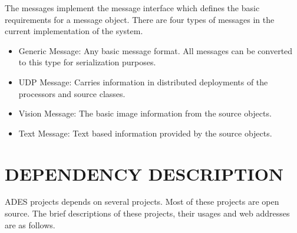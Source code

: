 \documentclass[a4paper,oneside,12pt]{report}
\begin{document}
The messages implement the message interface which defines the basic requirements for a message object. There are four types of messages in the current implementation of the system. 
\begin{itemize}
	\item Generic Message: Any basic message format. All messages can be converted to this type for serialization purposes.
	\item UDP Message: Carries information in distributed deployments of the processors and source classes.
	\item Vision Message: The basic image information from the source objects.
	\item Text Message: Text based information provided by the source objects.
\end{itemize}

\section{DEPENDENCY DESCRIPTION}

ADES projects depends on several projects. Most of these projects are open source. The brief descriptions of these projects, their usages and web addresses are as follows.
\end{document}
